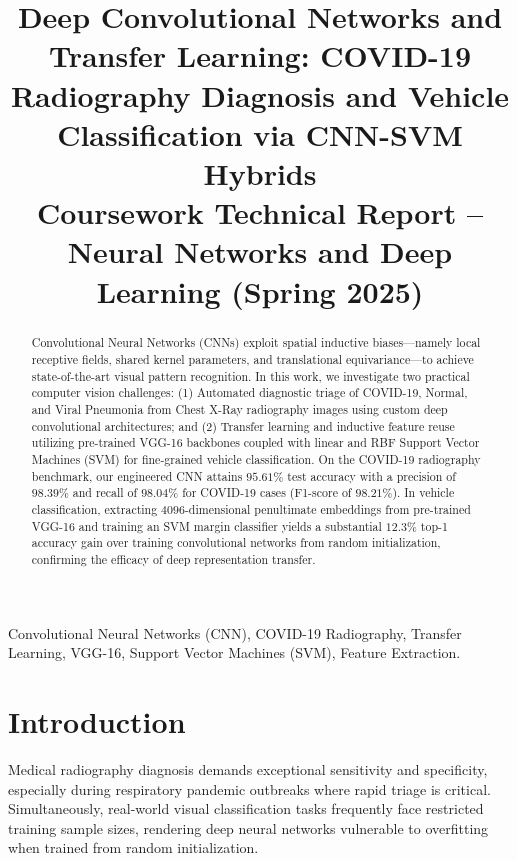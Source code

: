 \documentclass[conference]{IEEEtran}
\begin{document}
\title{Deep Convolutional Networks and Transfer Learning: COVID-19 Radiography Diagnosis and Vehicle Classification via CNN-SVM Hybrids\\
\large Coursework Technical Report -- Neural Networks and Deep Learning (Spring 2025)}

\author{
}

\maketitle

\begin{abstract}
Convolutional Neural Networks (CNNs) exploit spatial inductive biases---namely local receptive fields, shared kernel parameters, and translational equivariance---to achieve state-of-the-art visual pattern recognition. In this work, we investigate two practical computer vision challenges: (1) Automated diagnostic triage of COVID-19, Normal, and Viral Pneumonia from Chest X-Ray radiography images using custom deep convolutional architectures; and (2) Transfer learning and inductive feature reuse utilizing pre-trained VGG-16 backbones coupled with linear and RBF Support Vector Machines (SVM) for fine-grained vehicle classification. On the COVID-19 radiography benchmark, our engineered CNN attains $95.61\%$ test accuracy with a precision of $98.39\%$ and recall of $98.04\%$ for COVID-19 cases (F1-score of $98.21\%$). In vehicle classification, extracting $4096$-dimensional penultimate embeddings from pre-trained VGG-16 and training an SVM margin classifier yields a substantial $12.3\%$ top-1 accuracy gain over training convolutional networks from random initialization, confirming the efficacy of deep representation transfer.
\end{abstract}

\begin{IEEEkeywords}
Convolutional Neural Networks (CNN), COVID-19 Radiography, Transfer Learning, VGG-16, Support Vector Machines (SVM), Feature Extraction.
\end{IEEEkeywords}

\section{Introduction}
Medical radiography diagnosis demands exceptional sensitivity and specificity, especially during respiratory pandemic outbreaks where rapid triage is critical. Simultaneously, real-world visual classification tasks frequently face restricted training sample sizes, rendering deep neural networks vulnerable to overfitting when trained from random initialization.
\end{document}
